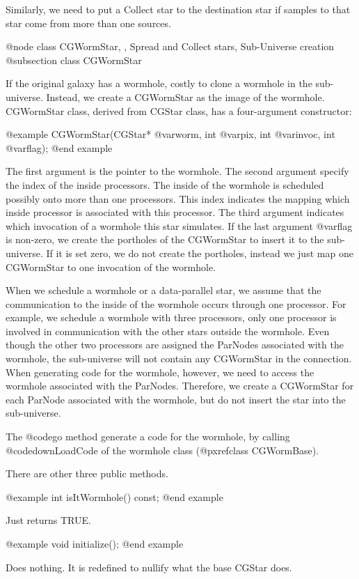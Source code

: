 Similarly, we need to put a Collect star to the destination star if
samples to that star come from more than one sources.

@node class CGWormStar, , Spread and Collect stars, Sub-Universe creation
@subsection class CGWormStar

If the original galaxy has a wormhole,
costly to clone a wormhole in the sub-universe. Instead, we create
a CGWormStar as the image of the wormhole. CGWormStar class, derived from
CGStar class, has
a four-argument constructor:

@example
CGWormStar(CGStar* @var{worm}, int @var{pix}, int @var{invoc}, int @var{flag});
@end example

The first argument is the pointer to the wormhole. The second argument
specify the index of the inside processors. The inside of the wormhole
is scheduled possibly onto more than one processors. This index indicates
the mapping which inside processor is associated with this processor.
The third argument indicates which invocation of a wormhole this star
simulates. If the last argument @var{flag} is non-zero, we create
the portholes of the CGWormStar to insert it to the sub-universe.
If it is set zero, we do not create the portholes, instead we just map
one CGWormStar to one invocation of the wormhole. 

When we schedule a wormhole or a data-parallel star, we assume that
the communication to the inside of the wormhole occurs through one
processor. For example, we schedule a wormhole with three processors,
only one processor is involved in communication with the other
stars outside the wormhole. Even though the other two processors are assigned
the ParNodes associated with the wormhole, the sub-universe will not
contain any CGWormStar in the connection. When generating code for the
wormhole, however, we need to access the wormhole associated with the
ParNodes. Therefore, we create a CGWormStar for each ParNode associated with
the wormhole, but do not insert the star into the sub-universe.

The @code{go} method generate a code for the wormhole, by calling
@code{downLoadCode} of the wormhole class (@pxref{class CGWormBase}).

There are other three public methods.

@example
int isItWormhole() const;
@end example

Just returns TRUE.

@example
void initialize();
@end example

Does nothing. It is redefined to nullify what the base CGStar does.
 
